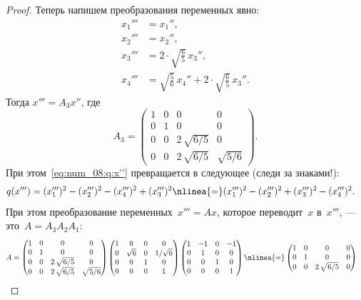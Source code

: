 \begin{proof}
	Теперь напишем преобразования переменных явно:
	\begin{align*}
		x_1''' &= x_1'',
		\\
		x_2''' &= x_2'',
		\\
		x_3''' &= 2 \cdot \sqrt{\frac{6}{5}}\,x_3'',
		\\
		x_4''' &=
			\sqrt{\frac{5}{6}}\,x_4''
			+
			2 \cdot 
			\sqrt{\frac{6}{5}}
			\,
			x_3''
			.
	\end{align*}
	Тогда $x''' = A_3 x''$, где
	\[
		A_3 =
		\begin{pmatrix}
			1 & 0 & 0 & 0 \\
			0 & 1 & 0 & 0 \\
			0 & 0 & 2\,\sqrt{6/5} & 0
			\\
			0 & 0 & 2\,\sqrt{6/5} & \sqrt{5/6}
		\end{pmatrix}
		.
	\]
	При этом~\eqref{eq:num_08:q:x''} превращается в следующее (следи за знаками!):
	\begin{align*}
		q(x''') &=
		(x_1''')^2 -
		(x_2''')^2 -
		(x_4''')^2 +
		(x_3''')^2
		\nlinea{=}
		(x_1''')^2 -
		(x_2''')^2 +
		(x_3''')^2 -
		(x_4''')^2
		.
	\end{align*}
	При этом преобразование переменных~$x''' = Ax$, которое переводит~$x$ в~$x'''$, --- это~$A = A_3 A_2 A_1$:
	\begin{align*}
		A &=
		\begin{pmatrix}
			1 & 0 & 0 & 0 \\
			0 & 1 & 0 & 0 \\
			0 & 0 & 2\,\sqrt{6/5} & 0
			\\
			0 & 0 & 2\,\sqrt{6/5} & \sqrt{5/6}
		\end{pmatrix}
		\begin{pmatrix}
			1 & 0 & 0 & 0
			\\
			0 & \sqrt{6} & 0 & 1/\sqrt{6}
			\\
			0 & 0 & 1 & 0
			\\
			0 & 0 & 0 & 1
		\end{pmatrix}
		\begin{pmatrix}
			1 & -1 & 0 & -1
			\\
			0 & 1 & 0 & 0
			\\
			0 & 0 & 1 & 0
			\\
			0 & 0 & 0 & 1
		\end{pmatrix}
		\nlinea{=}
		\begin{pmatrix}
			1 & 0 & 0 & 0 \\
			0 & 1 & 0 & 0 \\
			0 & 0 & 2\,\sqrt{6/5} & 0

\end{pmatrix}
\end{align*}
\end{proof}
